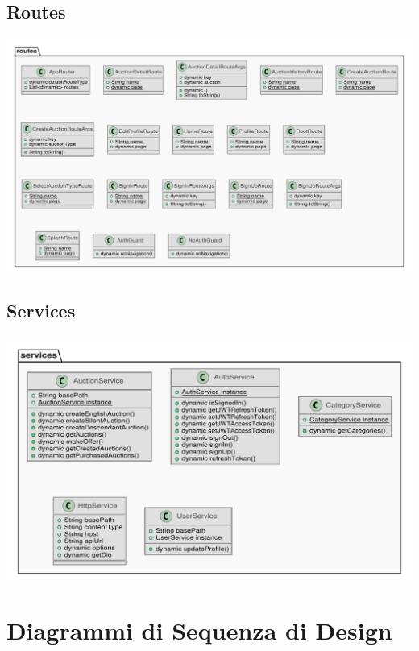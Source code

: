 \subsection{Routes}
\includegraphics[width=\textwidth]{assets/uml_design/routes.pdf}
\subsection{Services}
\includegraphics[width=\textwidth]{assets/uml_design/services.pdf}




\section{Diagrammi di Sequenza di Design}
